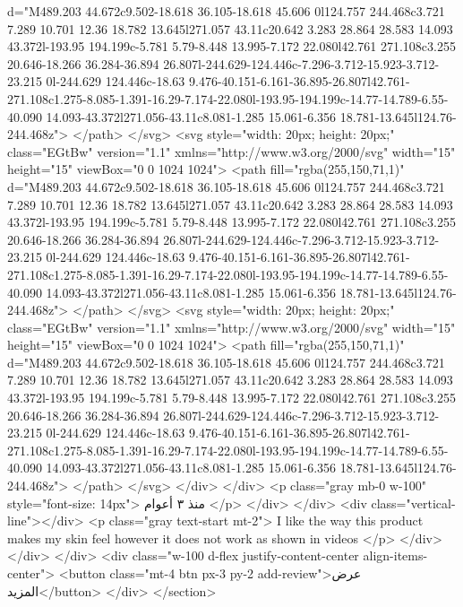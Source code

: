                         d="M489.203 44.672c9.502-18.618 36.105-18.618 45.606 0l124.757 244.468c3.721 7.289 10.701 12.36 18.782 13.645l271.057 43.11c20.642 3.283 28.864 28.583 14.093 43.372l-193.95 194.199c-5.781 5.79-8.448 13.995-7.172 22.080l42.761 271.108c3.255 20.646-18.266 36.284-36.894 26.807l-244.629-124.446c-7.296-3.712-15.923-3.712-23.215 0l-244.629 124.446c-18.63 9.476-40.151-6.161-36.895-26.807l42.761-271.108c1.275-8.085-1.391-16.29-7.174-22.080l-193.95-194.199c-14.77-14.789-6.55-40.090 14.093-43.372l271.056-43.11c8.081-1.285 15.061-6.356 18.781-13.645l124.76-244.468z">
                      </path>
                    </svg>
                    <svg style="width: 20px; height: 20px;" class="EGtBw" version="1.1"
                      xmlns="http://www.w3.org/2000/svg" width="15" height="15" viewBox="0 0 1024 1024">
                      <path fill="rgba(255,150,71,1)"
                        d="M489.203 44.672c9.502-18.618 36.105-18.618 45.606 0l124.757 244.468c3.721 7.289 10.701 12.36 18.782 13.645l271.057 43.11c20.642 3.283 28.864 28.583 14.093 43.372l-193.95 194.199c-5.781 5.79-8.448 13.995-7.172 22.080l42.761 271.108c3.255 20.646-18.266 36.284-36.894 26.807l-244.629-124.446c-7.296-3.712-15.923-3.712-23.215 0l-244.629 124.446c-18.63 9.476-40.151-6.161-36.895-26.807l42.761-271.108c1.275-8.085-1.391-16.29-7.174-22.080l-193.95-194.199c-14.77-14.789-6.55-40.090 14.093-43.372l271.056-43.11c8.081-1.285 15.061-6.356 18.781-13.645l124.76-244.468z">
                      </path>
                    </svg>
                    <svg style="width: 20px; height: 20px;" class="EGtBw" version="1.1"
                      xmlns="http://www.w3.org/2000/svg" width="15" height="15" viewBox="0 0 1024 1024">
                      <path fill="rgba(255,150,71,1)"
                        d="M489.203 44.672c9.502-18.618 36.105-18.618 45.606 0l124.757 244.468c3.721 7.289 10.701 12.36 18.782 13.645l271.057 43.11c20.642 3.283 28.864 28.583 14.093 43.372l-193.95 194.199c-5.781 5.79-8.448 13.995-7.172 22.080l42.761 271.108c3.255 20.646-18.266 36.284-36.894 26.807l-244.629-124.446c-7.296-3.712-15.923-3.712-23.215 0l-244.629 124.446c-18.63 9.476-40.151-6.161-36.895-26.807l42.761-271.108c1.275-8.085-1.391-16.29-7.174-22.080l-193.95-194.199c-14.77-14.789-6.55-40.090 14.093-43.372l271.056-43.11c8.081-1.285 15.061-6.356 18.781-13.645l124.76-244.468z">
                      </path>
                    </svg>
                  </div>
                </div>
                <p class="gray mb-0 w-100" style="font-size: 14px">
                  منذ ٣ أعوام
                </p>
              </div>
            </div>
            <div class="vertical-line"></div>
            <p class="gray text-start mt-2">
              I like the way this product makes my skin feel however it does not
              work as shown in videos
            </p>
          </div>
        </div>
      </div>
      <div class="w-100 d-flex justify-content-center align-items-center">
        <button class="mt-4 btn px-3 py-2 add-review">عرض المزيد</button>
      </div>
    </section>

